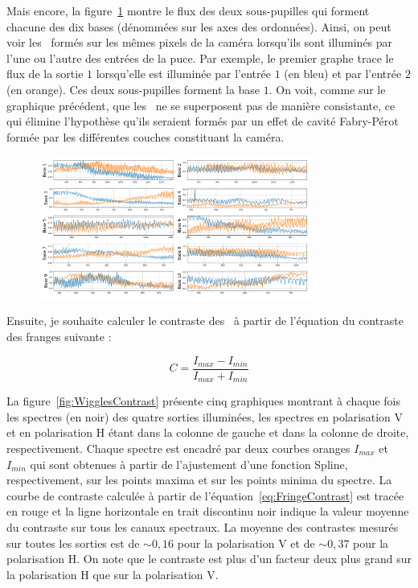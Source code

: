 Mais encore, la figure~\ref{fig:WigglesIniInjComp} montre le flux des deux sous-pupilles qui forment chacune des dix bases (dénommées sur les axes des ordonnées). Ainsi, on peut voir les \wiggles~formés sur les mêmes pixels de la caméra lorsqu'ils sont illuminés par l'une ou l'autre des entrées de la puce. Par exemple, le premier graphe trace le flux de la sortie $1$ lorsqu'elle est illuminée par l'entrée $1$ (en bleu) et par l'entrée $2$ (en orange). Ces deux sous-pupilles forment la base $1$. On voit, comme sur le graphique précédent, que les \wiggles~ne se superposent pas de manière consistante, ce qui élimine l'hypothèse qu'ils seraient formés par un effet de cavité Fabry-Pérot formée par les différentes couches constituant la caméra.

\begin{figure}[ht!]
    \centering
    \includegraphics[width=0.8\textwidth]{Figure_Chap4/20220811_P2VM_01_Flat1_Spectra_BaseOut1Out2_Pola1.png}
    \caption{}
    \label{fig:WigglesIniInjComp}
\end{figure}

Ensuite, je souhaite calculer le contraste des \wiggles~à partir de l'équation du contraste des franges suivante :

\begin{equation}
    C = \frac{I_{max} - I_{min}}{I_{max} + I_{min}} \label{eq:FringeContrast}
\end{equation}

La figure~\ref{fig:WigglesContrast} présente cinq graphiques montrant à chaque fois les spectres (en noir) des quatre sorties illuminées, les spectres en polarisation V et en polarisation H étant dans la colonne de gauche et dans la colonne de droite, respectivement. Chaque spectre est encadré par deux courbes oranges $I_{max}$ et $I_{min}$ qui sont obtenues à partir de l'ajustement d'une fonction Spline, respectivement, sur les points maxima et sur les points minima du spectre. La courbe de contraste calculée à partir de l'équation~\ref{eq:FringeContrast} est tracée en rouge et la ligne horizontale en trait discontinu noir indique la valeur moyenne du contraste sur tous les canaux spectraux. La moyenne des contrastes mesurés sur toutes les sorties est de $\sim 0,16$ pour la polarisation V et de $\sim 0,37$ pour la polarisation H. On note que le contraste est plus d'un facteur deux plus grand sur la polarisation H que sur la polarisation V.

